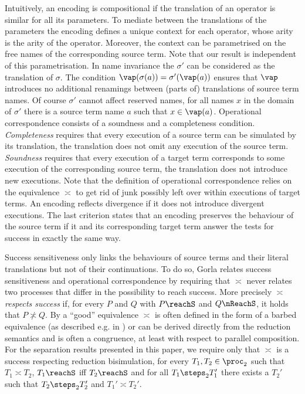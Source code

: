 \documentclass[final,copyright,creativecommons]{eptcs}
\begin{document}
Intuitively, an encoding is compositional if the translation of an operator is similar for all its parameters. To mediate between the translations of the parameters the encoding defines a unique context for each operator, whose arity is the arity of the operator. Moreover, the context can be parametrised on the free names of the corresponding source term. Note that our result is independent of this parametrisation.
In name invariance the $ \sigma' $ can be considered as the translation of $ \sigma $. The condition $ \vap(\sigma(a)) = \sigma'(\vap(a)) $ ensures that $ \vap $ introduces no additional renamings between (parts of) translations of source term names. Of course $ \sigma' $ cannot affect reserved names, \ie for all names $ x $ in the domain of $ \sigma' $ there is a source term name $ a $ such that $ x \in \vap\!\left( a \right) $.
Operational correspondence consists of a soundness and a completeness condition. \emph{Completeness} requires that every execution of a source term can be simulated by its translation, \ie the translation does not omit any execution of the source term. \emph{Soundness} requires that every execution of a target term corresponds to some execution of the corresponding source term, \ie the translation does not introduce new executions.
Note that the definition of operational correspondence relies on the equivalence $ \asymp $ to get rid of junk possibly left over within executions of target terms. An encoding reflects divergence if it does not introduce divergent executions.
The last criterion states that an encoding preserves the behaviour of the source term if it and its corresponding target term answer the tests for success in exactly the same way.

Success sensitiveness only links the behaviours of source terms and their literal translations but not of their continuations. To do so, Gorla relates success sensitiveness and operational correspondence by requiring that $ \asymp $ never relates two processes that differ in the possibility to reach success. More precisely $ \asymp $ \emph{respects success} if, for every $ P $ and $ Q $ with $ P \reachS $ and $ Q \nReachS $, it holds that $ P \not\asymp Q $.
By \cite{gorla} a ``good'' equivalence $ \asymp $ is often defined in the form of a barbed equivalence (as described e.g. in \cite{milnerSangiorgi92}) or can be derived directly from the reduction semantics and is often a congruence, at least with respect to parallel composition. For the separation results presented in this paper, we require only that $ \asymp $ is a success respecting reduction bisimulation, \ie for every $ T_1, T_2 \in \proc_2 $ such that $ T_1 \asymp T_2 $, $ T_1 \reachS $ iff $ T_2 \reachS $ and for all $ T_1 \steps_2 T_1' $ there exists a $ T_2' $ such that $ T_2 \steps_2 T_2' $ and $ T_1' \asymp T_2' $.
\end{document}
